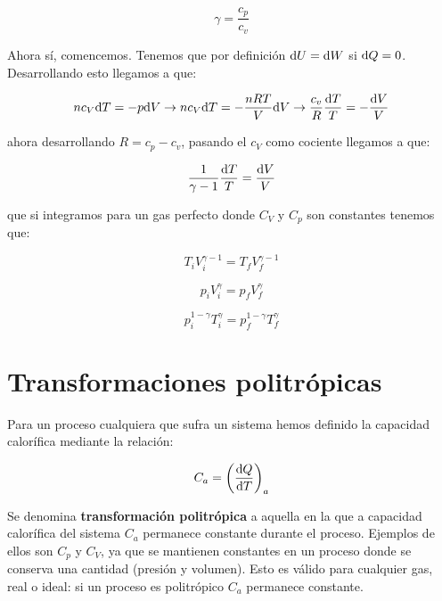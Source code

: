 \documentclass[12pt,a4paper,oneside]{book}
\begin{document}
 \begin{equation}
\gamma = \frac{c_p}{c_v}
\end{equation}

Ahora sí, comencemos. Tenemos que por definición $\mathrm{d} U = \mathrm{d} W$ si $\mathrm{d} Q = 0$. Desarrollando esto llegamos a que:

$$
n c_V \mathrm{d} T = - p \mathrm{d} V \rightarrow n c_V \mathrm{d} T = - \dfrac{nRT}{V} \mathrm{d} V \rightarrow \dfrac{c_v}{R} \dfrac{\mathrm{d} T}{T} = - \dfrac{\mathrm{d} V}{V}
$$

ahora desarrollando $R=c_p - c_v $, pasando el $c_V$ como cociente llegamos a que:

\begin{equation}
\dfrac{1}{\gamma -1} \dfrac{\mathrm{d} T}{T} = \dfrac{\mathrm{d} V}{V}
\end{equation}


que si integramos para un gas perfecto donde $C_V$ y $C_p$ son constantes tenemos que:

\begin{equation}
T_i V_i^{\gamma-1} = T_f V_f^{\gamma-1} 
\end{equation}


\begin{equation}
p_i V_i^{\gamma} = p_f V_f^{\gamma}
\end{equation}


\begin{equation}
p_i^{1-\gamma} T_i^{\gamma} = p_f^{1-\gamma} T_f^{\gamma} 
\end{equation}


\section{Transformaciones politrópicas}

Para un proceso cualquiera que sufra un sistema hemos definido la capacidad calorífica mediante la relación:

\begin{equation}
C_a = \left( \dfrac{\mathrm{d} Q}{\mathrm{d} T}  \right)_a
\end{equation}

Se denomina \textbf{transformación politrópica} a aquella en la que a capacidad calorífica del sistema $C_a$ permanece constante durante el proceso. Ejemplos de ellos son $C_p$ y $C_V$, ya que se mantienen constantes en un proceso donde se conserva una cantidad (presión y volumen). Esto es válido para cualquier gas, real o ideal: si un proceso es politrópico $C_a$ permanece constante. \\
\end{document}
